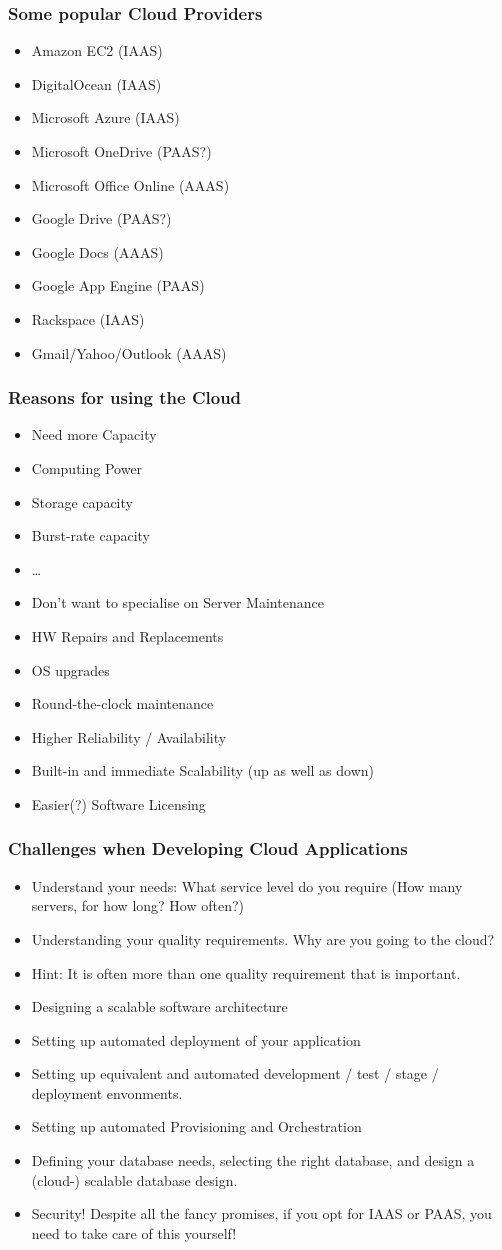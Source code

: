 \documentclass[10pt]{beamer}
\def\subitem{\item[\hspace{1.5cm} -]}
\begin{document}
\begin{frame}[t]
\frametitle{Some popular Cloud Providers}
\begin{itemize}
\item Amazon EC2 (IAAS)
\item DigitalOcean (IAAS)
\item Microsoft Azure (IAAS)
\item Microsoft OneDrive (PAAS?)
\item Microsoft Office Online (AAAS)
\item Google Drive (PAAS?)
\item Google Docs (AAAS)
\item Google App Engine (PAAS)
\item Rackspace (IAAS)
\item Gmail/Yahoo/Outlook (AAAS)
\end{itemize}
\end{frame}


\begin{frame}[t]
\frametitle{Reasons for using the Cloud}
\begin{itemize}
\item Need more Capacity
\subitem Computing Power
\subitem Storage capacity
\subitem Burst-rate capacity
\subitem \ldots
\item Don't want to specialise on Server Maintenance
\subitem HW Repairs and Replacements
\subitem OS upgrades
\subitem Round-the-clock maintenance
\item Higher Reliability / Availability
\item Built-in and immediate Scalability (up as well as down)
\item Easier(?) Software Licensing
\end{itemize}
\end{frame}



\begin{frame}[t]
\frametitle{Challenges when Developing Cloud Applications}
\begin{itemize}[<+->]
\item Understand your needs: What service level do you require (How many servers, for how long? How often?)
\item Understanding your quality requirements. Why are you going to the cloud?
\subitem Hint: It is often more than one quality requirement that is important.
\item Designing a scalable software architecture
\item Setting up automated deployment of your application
\item Setting up equivalent and automated development / test / stage / deployment envonments.
\item Setting up automated Provisioning and Orchestration
\item Defining your database needs, selecting the right database, and design a (cloud-) scalable database design.
\item Security! Despite all the fancy promises, if you opt for IAAS or PAAS, you need to take care of this yourself!
\end{itemize}
\end{frame}
\end{document}
